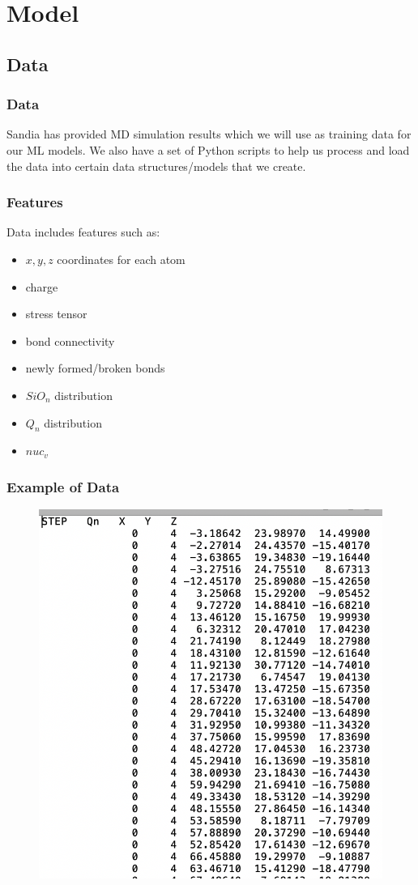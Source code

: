 \section{Model}

\subsection{Data}
\frame
{
\frametitle{Data}
\begin{block}{}
Sandia has provided MD simulation results which we will use as training data for our ML models. We also have a set of Python scripts to help us process and load the data into certain data structures/models that we create.
\end{block}
}

\frame
{
\frametitle{Features}
\begin{block}{}
Data includes features such as:
\begin{itemize}
    \item $x, y, z$ coordinates for each atom
    \item charge
    \item stress tensor
    \item bond connectivity
    \item newly formed/broken bonds
    \item $SiO_n$ distribution
    \item $Q_n$ distribution
    \item $nuc_v$
\end{itemize}
\end{block}
}

\frame
{
  \frametitle{Example of Data}
  \begin{block}{}

			\begin{figure}[h]
				\centering
				\includegraphics[width=.5\textwidth]{Q_n.png}
			\end{figure}
 
    \end{block}
}


